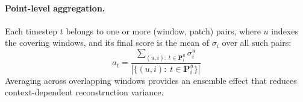 \paragraph{Point-level aggregation.}
Each timestep $t$ belongs to one or more (window, patch) pairs, where $u$ indexes the covering
windows, and its final score is the mean of $\sigma_i$ over all such pairs:
\begin{equation}
  a_t = \frac{\displaystyle\sum_{(u,i):\; t \in \mathbf{P}^u_i} \sigma^u_i}
             {\left|\{(u,i):\; t \in \mathbf{P}^u_i\}\right|}
  \label{eq:agg}
\end{equation}
Averaging across overlapping windows provides an ensemble effect that reduces
context-dependent reconstruction variance.

\BodyFloatBarrier
